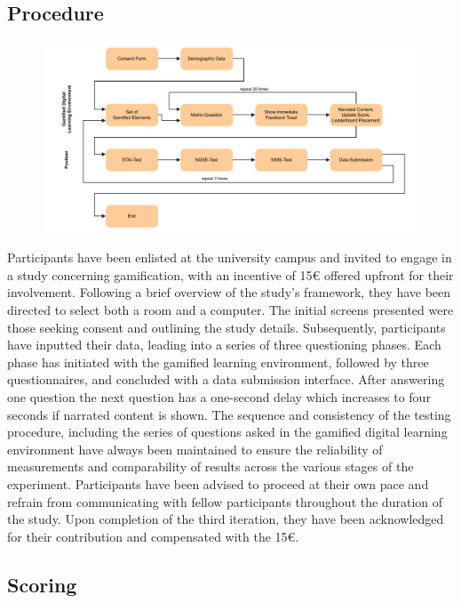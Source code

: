 \subsection{Procedure}
\begin{figure}[H]
  \centering
  \includegraphics[width=\textwidth]{img/Procedure}
  \label{fig:figureDetails}
\end{figure}
Participants have been enlisted at the university campus and invited to engage in a study concerning gamification, with an incentive of 15€ offered upfront for their involvement.
Following a brief overview of the study's framework, they have been directed to select both a room and a computer.
The initial screens presented were those seeking consent and outlining the study details. Subsequently, participants have inputted their data, leading into a series of three questioning phases.
Each phase has initiated with the gamified learning environment, followed by three questionnaires, and concluded with a data submission interface.
After answering one question the next question has a one-second delay which increases to four seconds if narrated content is shown.
The sequence and consistency of the testing procedure, including the series of questions asked in the gamified digital learning environment have always been maintained to ensure the reliability of measurements and comparability of results across the various stages of the experiment.
Participants have been advised to proceed at their own pace and refrain from communicating with fellow participants throughout the duration of the study.
Upon completion of the third iteration, they have been acknowledged for their contribution and compensated with the 15€.

\subsection{Scoring}

